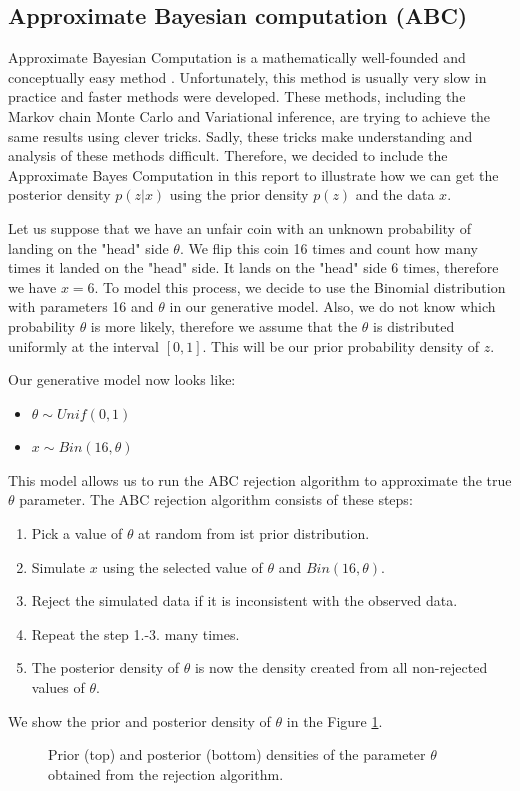 \subsection{Approximate Bayesian computation (ABC)}
Approximate Bayesian Computation is a mathematically well-founded and conceptually easy method \cite{marin2012approximate}.
Unfortunately, this method is usually very slow in practice and faster methods were developed.
These methods, including the Markov chain Monte Carlo and Variational inference, are trying to achieve the same results using clever tricks.
Sadly, these tricks make understanding and analysis of these methods difficult.
Therefore, we decided to include the Approximate Bayes Computation in this report to illustrate how we can get the posterior density $p(z|x)$ using the prior density $p(z)$ and the data $x$.

\begin{example}
Let us suppose that we have an unfair coin with an unknown probability of landing on the "head" side $\theta$.
We flip this coin 16 times and count how many times it landed on the "head" side.
It lands on the "head" side 6 times, therefore we have $x = 6$.
To model this process, we decide to use the Binomial distribution with parameters 16 and $\theta$ in our generative model.
Also, we do not know which probability $\theta$ is more likely, therefore we assume that the $\theta$ is distributed uniformly at the interval $[0, 1]$.
This will be our prior probability density of $z$.

Our generative model now looks like:
\begin{itemize}
    \item $\theta \sim Unif(0, 1)$
    \item $x \sim Bin(16, \theta)$
\end{itemize}

This model allows us to run the ABC rejection algorithm to approximate the true $\theta$ parameter.
The ABC rejection algorithm consists of these steps:
\begin{enumerate}
    \item Pick a value of $\theta$ at random from ist prior distribution.
    \item Simulate $x$ using the selected value of $\theta$ and $Bin(16, \theta)$.
    \item Reject the simulated data if it is inconsistent with the observed data.
    \item Repeat the step 1.-3. many times.
    \item The posterior density of $\theta$ is now the density created from all non-rejected values of $\theta$.
\end{enumerate}

We show the prior and posterior density of $\theta$ in the Figure \ref{fig:prior_posterior}.
\begin{figure}[H]
    \centering
    
    
    \caption{Prior (top) and posterior (bottom) densities of the parameter $\theta$ obtained from the rejection algorithm.}
    \label{fig:prior_posterior}
\end{figure}
\end{example}

